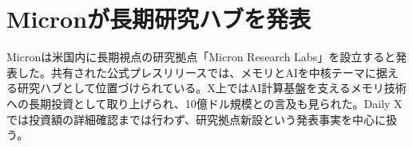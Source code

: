 \section{Micronが長期研究ハブを発表}
Micronは米国内に長期視点の研究拠点「Micron Research Labs」を設立すると発表した。共有された公式プレスリリースでは、メモリとAIを中核テーマに据える研究ハブとして位置づけられている。X上ではAI計算基盤を支えるメモリ技術への長期投資として取り上げられ、10億ドル規模との言及も見られた。Daily Xでは投資額の詳細確認までは行わず、研究拠点新設という発表事実を中心に扱う。
